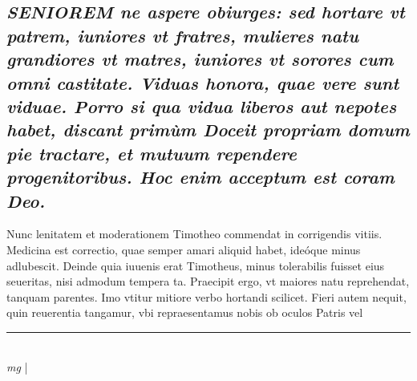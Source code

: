 \documentclass{article}
\begin{document}
\begin{pages}
\subsection*{\textit{\huge\textbf{S}\normalsize ENIOREM ne aspere obiurges: sed hortare vt patrem, iuniores vt fratres, mulieres natu grandiores vt matres, iuniores vt sorores cum omni castitate. Viduas honora, quae vere sunt viduae. Porro si qua vidua liberos aut nepotes habet, discant primùm Doceit propriam domum pie tractare, et mutuum rependere progenitoribus. Hoc enim acceptum est coram Deo. }}\pstart Nunc lenitatem et moderationem Timotheo commendat in corrigendis vitiis. Medicina est correctio, quae semper amari aliquid habet, ideóque minus adlubescit. Deinde quia iuuenis erat Timotheus, minus tolerabilis fuisset eius seueritas, nisi admodum tempera ta. Praecipit ergo, vt maiores natu reprehendat, tanquam parentes. Imo vtitur mitiore verbo hortandi scilicet. Fieri autem nequit, quin reuerentia tangamur, vbi repraesentamus nobis ob oculos Patris vel  \pend
\vspace{0.5cm}\noindent
\vspace{0.2cm}\rule{1cm}{0.2pt}\\ 
\hspace{0.2cm}\textit{mg}
\footnotesize 
\normalsize| 

\end{pages}
\end{document}
